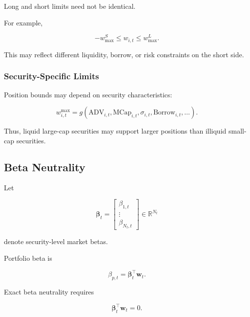 \documentclass[11pt,a4paper]{article}
\begin{document}
Long and short limits need not be identical.

For example,

\begin{equation}
-w_{\max}^{S}
\leq
w_{i,t}
\leq
w_{\max}^{L}.
\end{equation}

This may reflect different liquidity, borrow, or risk constraints on the short
side.


\subsubsection{Security-Specific Limits}

Position bounds may depend on security characteristics:

\begin{equation}
\boxed{
w_{i,t}^{\max}
=
g
\left(
\mathrm{ADV}_{i,t},
\mathrm{MCap}_{i,t},
\sigma_{i,t},
\mathrm{Borrow}_{i,t},
\ldots
\right).
}
\end{equation}

Thus, liquid large-cap securities may support larger positions than illiquid
small-cap securities.


\subsection{Beta Neutrality}
\label{subsec:portfolio_beta_neutrality}

Let

\begin{equation}
\boldsymbol{\beta}_t
=
\begin{bmatrix}
\beta_{1,t}\\
\vdots\\
\beta_{N_t,t}
\end{bmatrix}
\in
\mathbb{R}^{N_t}
\end{equation}

denote security-level market betas.

Portfolio beta is

\begin{equation}
\boxed{
\beta_{p,t}
=
\boldsymbol{\beta}_t^{\top}
\mathbf{w}_t.
}
\end{equation}

Exact beta neutrality requires

\begin{equation}
\boxed{
\boldsymbol{\beta}_t^{\top}
\mathbf{w}_t
=
0.
}
\end{equation}
\end{document}
